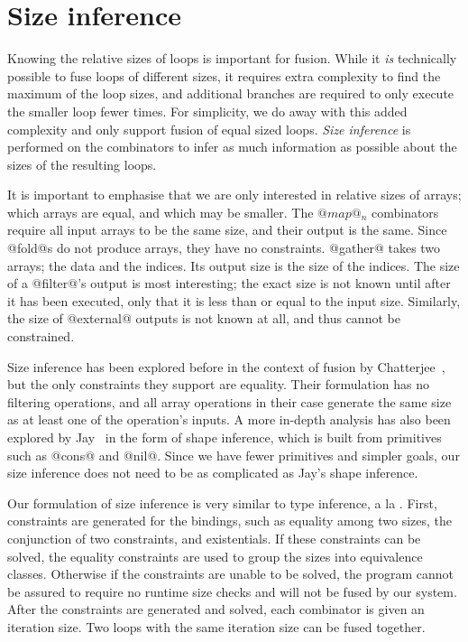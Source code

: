 \section{Size inference}
Knowing the relative sizes of loops is important for fusion.
While it \emph{is} technically possible to fuse loops of different sizes, it requires extra complexity to find the maximum of the loop sizes, and additional branches are required to only execute the smaller loop fewer times. For simplicity, we do away with this added complexity and only support fusion of equal sized loops. \emph{Size inference} is performed on the combinators to infer as much information as possible about the sizes of the resulting loops.

It is important to emphasise that we are only interested in relative sizes of arrays; which arrays are equal, and which may be smaller.
The $@map@_n$ combinators require all input arrays to be the same size, and their output is the same.
Since @fold@s do not produce arrays, they have no constraints.
@gather@ takes two arrays; the data and the indices. Its output size is the size of the indices.
The size of a @filter@'s output is most interesting; the exact size is not known until after it has been executed, only that it is less than or equal to the input size.
Similarly, the size of @external@ outputs is not known at all, and thus cannot be constrained.

Size inference has been explored before in the context of fusion by Chatterjee~\cite{chatterjee1991size}, but the only constraints they support are equality.
Their formulation has no filtering operations, and all array operations in their case generate the same size as at least one of the operation's inputs.
A more in-depth analysis has also been explored by Jay~\cite{jay1996shape} in the form of shape inference, which is built from primitives such as @cons@ and @nil@.
Since we have fewer primitives and simpler goals, our size inference does not need to be as complicated as Jay's shape inference.

Our formulation of size inference is very similar to type inference, a la \CITE.
First, constraints are generated for the bindings, such as equality among two sizes, the conjunction of two constraints, and existentials.
If these constraints can be solved, the equality constraints are used to group the sizes into equivalence classes.
Otherwise if the constraints are unable to be solved, the program cannot be assured to require no runtime size checks and will not be fused by our system.
After the constraints are generated and solved, each combinator is given an iteration size.
Two loops with the same iteration size can be fused together.

